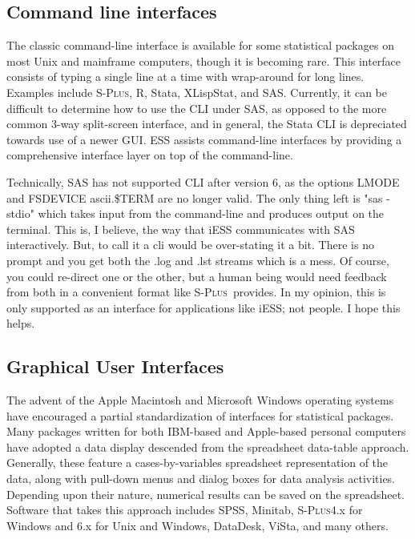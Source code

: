\documentclass{article}
\newcommand*{\Splus}{\textsc{S-Plus}}
\begin{document}
\subsection{Command line interfaces}
\label{sec:UI:command}

The classic command-line interface is available for some statistical
packages on most Unix and mainframe computers, though it is becoming
rare.  This interface consists of typing a single line at a time with
wrap-around for long lines.  Examples include \Splus, R, Stata,
XLispStat, and SAS.  Currently, it can be difficult to determine how
to use the CLI under SAS, as opposed to the more common 3-way
split-screen interface, and in general, the Stata CLI is depreciated
towards use of a newer GUI.  ESS assists command-line interfaces by
providing a comprehensive interface layer on top of the command-line.

Technically, SAS has not supported CLI after version 6, as the options
LMODE and FSDEVICE ascii.\$TERM are no longer valid.  The only thing
left is "sas -stdio" which takes input from the command-line and
produces output on the terminal.  This is, I believe, the way that
iESS communicates with SAS interactively.  But, to call it a cli would
be over-stating it a bit.  There is no prompt and you get both the
.log and .lst streams which is a mess.  Of course, you could re-direct
one or the other, but a human being would need feedback from both in a
convenient format like \Splus\ provides.  In my opinion, this is only
supported as an interface for applications like iESS; not people.  I
hope this helps.

\subsection{Graphical User Interfaces}
\label{sec:UI:GUI}

The advent of the Apple Macintosh and Microsoft Windows operating
systems have encouraged a partial standardization of interfaces for
statistical packages.  Many packages written for both IBM-based and
Apple-based personal computers have adopted a data display 
descended from the spreadsheet
data-table approach.  Generally, these feature a cases-by-variables
spreadsheet representation of the data, along with pull-down menus and
dialog boxes for data analysis activities.  Depending upon their
nature, numerical results can be saved on the spreadsheet.  Software
that takes this approach includes SPSS, Minitab, \Splus 4.x for Windows and 6.x for Unix and Windows,
DataDesk, ViSta, and many others.
\end{document}

